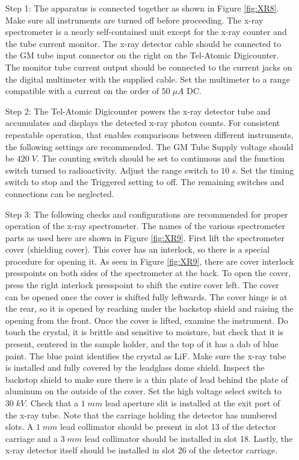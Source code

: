 \documentclass[12pt, a4paper, oneside, openright, titlepage]{book}
\begin{document}
\begin{itemize}[leftmargin = 50pt]
    \item[Step 1:] The apparatus is connected together as shown in Figure \ref{fig:XR8}. Make sure all instruments are turned off before proceeding. The x-ray spectrometer is a nearly self-contained unit except for the x-ray counter and the tube current monitor. The x-ray detector cable should be connected to the GM tube input connector on the right on the Tel-Atomic Digicounter. The monitor tube current output should be connected to the current jacks on the digital multimeter with the supplied cable. Set the multimeter to a range compatible with a current on the order of $50 \;\mu A$ DC.
    \item[Step 2:] The Tel-Atomic Digicounter powers the x-ray detector tube and accumulates and displays the detected x-ray photon counts. For consistent repeatable operation, that enables comparisons between different instruments, the following settings are recommended. The GM Tube Supply voltage should be $420\; V$. The counting switch should be set to continuous and the function switch turned to radioactivity. Adjust the range switch to $10\;s$. Set the timing switch to stop and the Triggered setting to off. The remaining switches and connections can be neglected.
    \item[Step 3:] The following checks and configurations are recommended for proper operation of the x-ray spectrometer. The names of the various spectrometer parts as used here are shown in Figure \ref{fig:XR9}. First lift the spectrometer cover (shielding cover). This cover has an interlock, so there is a special procedure for opening it. As seen in Figure \ref{fig:XR9}, there are cover interlock presspoints on both sides of the spectrometer at the back. To open the cover, press the right interlock presspoint to shift the entire cover left. The cover can be opened once the cover is shifted fully leftwards. The cover hinge is at the rear, so it is opened by reaching under the backstop shield and raising the opening from the front. Once the cover is lifted, examine the instrument. Do  touch the crystal, it is brittle and sensitive to moisture, but check that it is present, centered in the sample holder, and the top of it has a dab of blue paint. The blue paint identifies the crystal as LiF. Make sure the x-ray tube is installed and fully covered by the leadglass dome shield. Inspect the backstop shield to make sure there is a thin plate of lead behind the plate of aluminum on the outside of the cover. Set the high voltage select switch to $30 \;kV$. Check that a $1\;mm$ lead aperture slit is installed at the exit port of the x-ray tube. Note that the carriage holding the detector has numbered slots. A $1 \;mm$ lead collimator should be present in slot 13 of the detector carriage and a $3\;mm$ lead collimator should be installed in slot 18. Lastly, the x-ray detector itself should be installed in slot 26 of the detector carriage.

\end{itemize}
\end{document}
